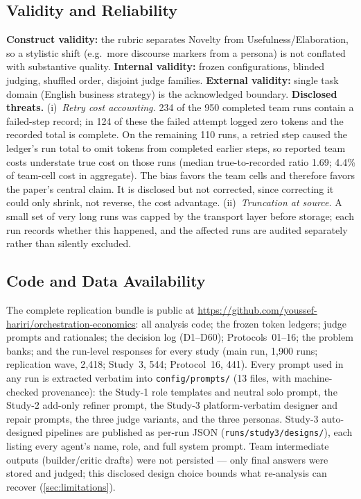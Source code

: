 \documentclass[12pt,a4paper]{article}
\begin{document}
\subsection{Validity and Reliability}

\textbf{Construct validity:} the rubric separates Novelty from
Usefulness/Elaboration, so a stylistic shift (e.g.\ more discourse markers from
a persona) is not conflated with substantive quality. \textbf{Internal validity:}
frozen configurations, blinded judging, shuffled order, disjoint judge families.
\textbf{External validity:} single task domain (English business strategy) is
the acknowledged boundary. \textbf{Disclosed threats.} (i)~\emph{Retry cost accounting.} 234 of the 950
completed team runs contain a failed-step record; in 124 of these the failed
attempt logged zero tokens and the recorded total is complete. On the
remaining 110 runs, a retried step caused the ledger's run total to omit
tokens from completed earlier steps, so reported team costs understate true
cost on those runs (median true-to-recorded ratio 1.69; 4.4\% of team-cell
cost in aggregate). The bias favors the team cells and therefore favors the
paper's central claim. It is disclosed but not corrected, since correcting it
could only shrink, not reverse, the cost advantage. (ii)~\emph{Truncation at source.} A small set of
very long runs was capped by the transport layer before storage; each run
records whether this happened, and the affected runs are audited separately
rather than silently excluded.

\subsection{Code and Data Availability}
The complete replication bundle is public at
\url{https://github.com/youssef-hariri/orchestration-economics}:
all analysis code; the frozen token ledgers; judge prompts and rationales;
the decision log (D1--D60); Protocols~01--16; the problem banks; and the
run-level responses for every study (main run, 1{,}900 runs; replication
wave, 2{,}418; Study~3, 544; Protocol~16, 441). Every prompt used in any run
is extracted verbatim into \texttt{config/prompts/} (13 files, with
machine-checked provenance): the Study-1 role templates and neutral solo
prompt, the Study-2 add-only refiner prompt, the Study-3 platform-verbatim
designer and repair prompts, the three judge variants, and the three
personas. Study-3 auto-designed pipelines are published as per-run JSON
(\texttt{runs/study3/designs/}), each listing every agent's name, role, and
full system prompt. Team intermediate outputs (builder/critic drafts) were
not persisted --- only final answers were stored and judged; this disclosed
design choice bounds what re-analysis can recover (\cref{sec:limitations}).
\end{document}
